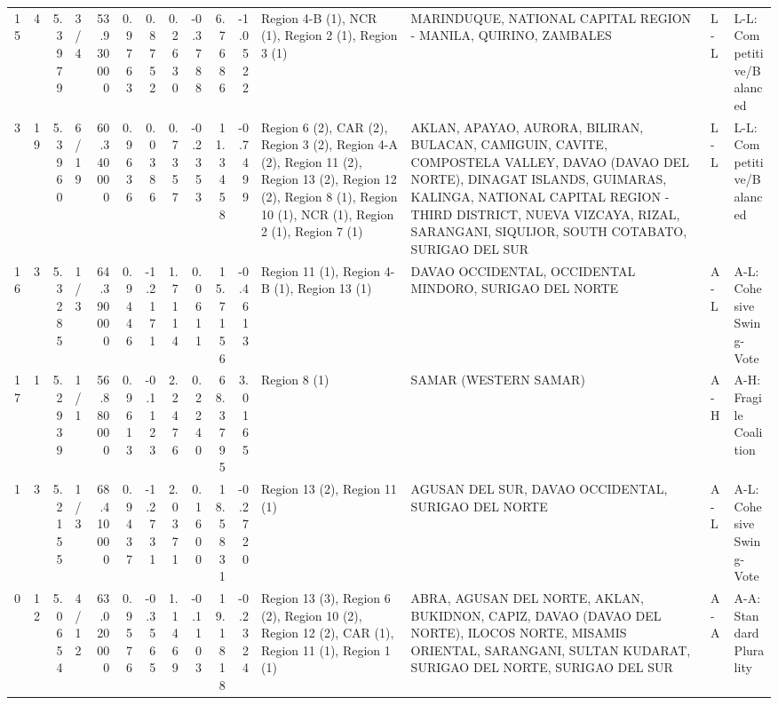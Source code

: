 \begin{tabular}{rrrlrrrrrrrllll}
15 & 4 & {\cellcolor[HTML]{F7BA9F}} \color[HTML]{000000} 5.3979 & 3/4 & {\cellcolor[HTML]{ADC9FD}} \color[HTML]{000000} 53.930000 & 0.9763 & 0.8752 & 0.2630 & -0.3788 & 6.7686 & -1.0522 & Region 4-B (1), NCR (1), Region 2 (1), Region 3 (1) & MARINDUQUE, NATIONAL CAPITAL REGION - MANILA, QUIRINO, ZAMBALES & L-L & L-L: Competitive/Balanced \\
3 & 19 & {\cellcolor[HTML]{F7BA9F}} \color[HTML]{000000} 5.3960 & 6/19 & {\cellcolor[HTML]{F1CCB8}} \color[HTML]{000000} 60.340000 & 0.9636 & 0.0386 & 0.7357 & -0.2353 & 11.3458 & -0.7499 & Region 6 (2), CAR (2), Region 3 (2), Region 4-A (2), Region 11 (2), Region 13 (2), Region 12 (2), Region 8 (1), Region 10 (1), NCR (1), Region 2 (1), Region 7 (1) & AKLAN, APAYAO, AURORA, BILIRAN, BULACAN, CAMIGUIN, CAVITE, COMPOSTELA VALLEY, DAVAO (DAVAO DEL NORTE), DINAGAT ISLANDS, GUIMARAS, KALINGA, NATIONAL CAPITAL REGION - THIRD DISTRICT, NUEVA VIZCAYA, RIZAL, SARANGANI, SIQUIJOR, SOUTH COTABATO, SURIGAO DEL SUR & L-L & L-L: Competitive/Balanced \\
16 & 3 & {\cellcolor[HTML]{F4C5AD}} \color[HTML]{000000} 5.3285 & 1/3 & {\cellcolor[HTML]{F39778}} \color[HTML]{000000} 64.390000 & 0.9446 & -1.2171 & 1.7114 & 0.0611 & 15.7156 & -0.4613 & Region 11 (1), Region 4-B (1), Region 13 (1) & DAVAO OCCIDENTAL, OCCIDENTAL MINDORO, SURIGAO DEL NORTE & A-L & A-L: Cohesive Swing-Vote \\
17 & 1 & {\cellcolor[HTML]{F2CAB5}} \color[HTML]{000000} 5.2939 & 1/1 & {\cellcolor[HTML]{D2DBE8}} \color[HTML]{000000} 56.880000 & 0.9613 & -0.1123 & 2.2476 & 0.2240 & 68.3795 & 3.0165 & Region 8 (1) & SAMAR (WESTERN SAMAR) & A-H & A-H: Fragile Coalition \\
1 & 3 & {\cellcolor[HTML]{EBD3C6}} \color[HTML]{000000} 5.2155 & 1/3 & {\cellcolor[HTML]{D1493F}} \color[HTML]{F1F1F1} 68.410000 & 0.9437 & -1.2731 & 2.0371 & 0.1600 & 18.5831 & -0.2720 & Region 13 (2), Region 11 (1) & AGUSAN DEL SUR, DAVAO OCCIDENTAL, SURIGAO DEL NORTE & A-L & A-L: Cohesive Swing-Vote \\
0 & 12 & {\cellcolor[HTML]{D8DCE2}} \color[HTML]{000000} 5.0654 & 4/12 & {\cellcolor[HTML]{F7AC8E}} \color[HTML]{000000} 63.020000 & 0.9576 & -0.3565 & 1.1469 & -0.1103 & 19.1818 & -0.2324 & Region 13 (3), Region 6 (2), Region 10 (2), Region 12 (2), CAR (1), Region 11 (1), Region 1 (1) & ABRA, AGUSAN DEL NORTE, AKLAN, BUKIDNON, CAPIZ, DAVAO (DAVAO DEL NORTE), ILOCOS NORTE, MISAMIS ORIENTAL, SARANGANI, SULTAN KUDARAT, SURIGAO DEL NORTE, SURIGAO DEL SUR & A-A & A-A: Standard Plurality \\

\end{tabular}
